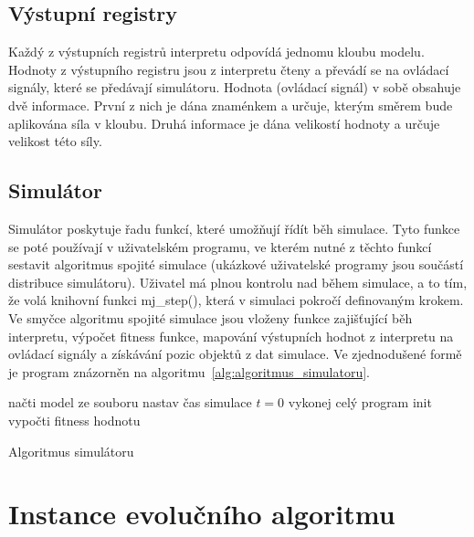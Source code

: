 \subsection{Výstupní registry}

Každý z výstupních registrů interpretu odpovídá jednomu kloubu modelu.
Hodnoty z výstupního registru jsou z interpretu čteny a převádí se na ovládací signály, které se předávají simulátoru.
Hodnota (ovládací signál) v sobě obsahuje dvě informace.
První z nich je dána znaménkem a určuje, kterým směrem bude aplikována síla v kloubu.
Druhá informace je dána velikostí hodnoty a určuje velikost této síly.


\subsection{Simulátor}
Simulátor poskytuje řadu funkcí, které umožňují řídít běh simulace.
Tyto funkce se poté používají v uživatelském programu, ve kterém nutné z těchto funkcí sestavit algoritmus spojité simulace (ukázkové uživatelské programy jsou součástí distribuce simulátoru).
Uživatel má plnou kontrolu nad během simulace, a to tím, že volá knihovní funkci mj\_step(), která v simulaci pokročí definovaným krokem.
Ve smyčce algoritmu spojité simulace jsou vloženy funkce zajišťující běh interpretu, výpočet fitness funkce, mapování výstupních hodnot z interpretu na ovládací signály a získávání pozic objektů z dat simulace.
Ve zjednodušené formě je program znázorněn na algoritmu~\ref{alg:algoritmus_simulatoru}.

\begin{algorithm}[H]
    načti model ze souboru\;
    nastav čas simulace $t = 0$\;
    vykonej celý program init\;
    vypočti fitness hodnotu\;
    \caption{Algoritmus simulátoru}
    \label{alg:algoritmus_simulatoru}
\end{algorithm}

\section{Instance evolučního algoritmu}
\label{sec:instance_ea}


